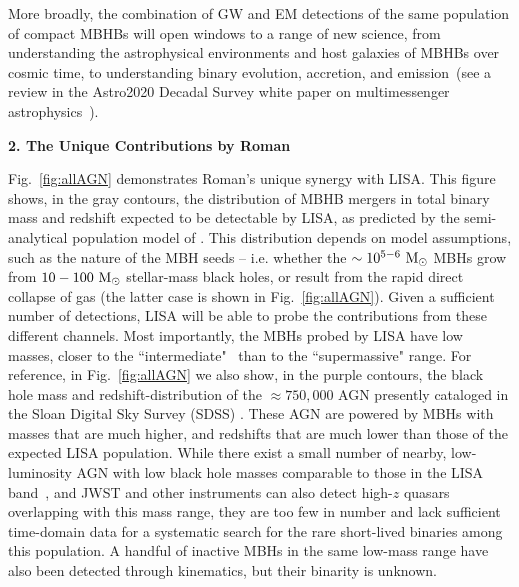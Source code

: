 \documentclass[tightenlines,superscriptaddress,amsmath,amssymb,prl,12pt]{revtex4-1}
\newcommand{\msun}{{\rm M}_\odot}
\begin{document}
More broadly, the combination of GW and EM detections of the same
population of compact MBHBs will open windows to a range of new
science, from understanding the astrophysical environments and host
galaxies of MBHBs over cosmic time, to understanding binary evolution,
accretion, and emission~(see a review in the Astro2020 Decadal Survey
white paper on multimessenger astrophysics~\cite{MMMBA-decadal}).

\vspace{\baselineskip}
{\bf 2. The Unique Contributions by Roman}
\vspace{0.5\baselineskip}


Fig.~\ref{fig:allAGN} demonstrates Roman's unique synergy with LISA.
This figure shows, in the gray contours, the distribution of MBHB
mergers in total binary mass and redshift expected to be detectable by
LISA, as predicted by the semi-analytical population model of
\cite{2019MNRAS.486.4044B}.  This distribution depends on model
assumptions, such as the nature of the MBH seeds -- i.e. whether the
$\sim10^{5-6}~\msun$ MBHs grow from $10-100~\msun$ stellar-mass black
holes, or result from the rapid direct collapse of gas (the latter
case is shown in Fig.~\ref{fig:allAGN}).  Given a sufficient number of
detections, LISA will be able to probe the contributions from these
different channels.  Most importantly, the MBHs probed by LISA have
low masses, closer to the
``intermediate"~\cite{Chilingarian+2018,Graham+2019} than to the
``supermassive" range.  For reference, in Fig.~\ref{fig:allAGN} we
also show, in the purple contours, the black hole mass and
redshift-distribution of the $\approx 750,000$ AGN presently cataloged
in the Sloan Digital Sky Survey (SDSS) \cite{Yang+2021,Wu+Shen2022}.
These AGN are powered by MBHs with masses that are much higher, and
redshifts that are much lower than those of the expected LISA
population.  While there exist a small number of nearby,
low-luminosity AGN with low black hole masses comparable to those in
the LISA band~\cite{Greene+2020,2021ApJ...923..146G}, and JWST and
other instruments can also detect high-$z$ quasars overlapping with
this mass range, they are too few in number and lack sufficient
time-domain data for a systematic search for the rare short-lived
binaries among this population.  A handful of inactive MBHs in the
same low-mass range have also been detected through kinematics, but
their binarity is unknown.
\end{document}
